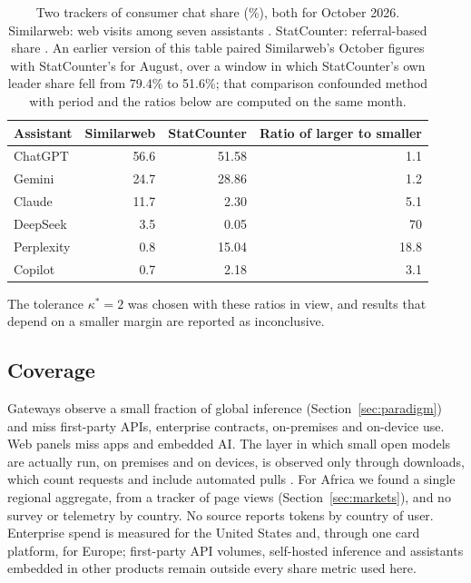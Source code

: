 \documentclass[11pt]{article}
\begin{document}
\begin{table}[h]
\centering\small
\caption{Two trackers of consumer chat share (\%), both for October 2026. Similarweb: web visits among seven assistants \cite{momentic2026chatbots}. StatCounter: referral-based share \cite{statcounter2026}. An earlier version of this table paired Similarweb's October figures with StatCounter's for August, over a window in which StatCounter's own leader share fell from 79.4\% to 51.6\%; that comparison confounded method with period and the ratios below are computed on the same month.}
\label{tab:trackers}
\begin{tabular}{@{}lrrr@{}}
\toprule
Assistant & Similarweb & StatCounter & Ratio of larger to smaller \\
\midrule
ChatGPT & 56.6 & 51.58 & 1.1 \\
Gemini & 24.7 & 28.86 & 1.2 \\
Claude & 11.7 & 2.30 & 5.1 \\
DeepSeek & 3.5 & 0.05 & 70 \\
Perplexity & 0.8 & 15.04 & 18.8 \\
Copilot & 0.7 & 2.18 & 3.1 \\
\bottomrule
\end{tabular}
\end{table}

 The tolerance $\kappa^{*}=2$ was chosen with these ratios in view, and results that depend on a smaller margin are reported as inconclusive.

\subsection{Coverage} Gateways observe a small fraction of global inference (Section~\ref{sec:paradigm}) and miss first-party APIs, enterprise contracts, on-premises and on-device use. Web panels miss apps and embedded AI. The layer in which small open models are actually run, on premises and on devices, is observed only through downloads, which count requests and include automated pulls \cite{lambert2026atom}. For Africa we found a single regional aggregate, from a tracker of page views (Section~\ref{sec:markets}), and no survey or telemetry by country. No source reports tokens by country of user. Enterprise spend is measured for the United States and, through one card platform, for Europe; first-party API volumes, self-hosted inference and assistants embedded in other products remain outside every share metric used here.
\end{document}
